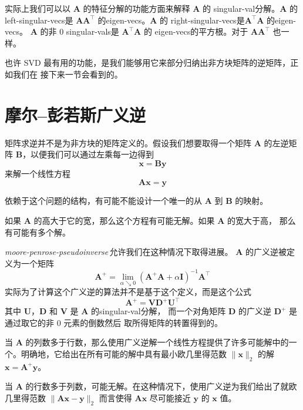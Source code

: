 实际上我们可以以 $\pmb{A}$ 的特征分解的功能方面来解释 $\pmb{A}$ 的
\gls*{singular-val}分解。$\pmb{A}$ 的\gls*{left-singular-vecs}是
$\pmb{A}\pmb{A}^{\top}$ 的\gls*{eigen-vecs}。$\pmb{A}$ 的
\gls*{right-singular-vecs}是$\pmb{A}^{\top}\pmb{A}$ 的\gls*{eigen-vecs}。
$\pmb{A}$ 的非 $0$ \gls*{singular-vals}是 $\pmb{A}^{\top}\pmb{A}$ 的
\gls*{eigen-vecs}的平方根。对于 $\pmb{A}\pmb{A}^{\top}$ 也一样。

也许 SVD 最有用的功能，是我们能够用它来部分归纳出非方块矩阵的逆矩阵，正如我们在
接下来一节会看到的。

\section{摩尔--彭若斯广义逆}
\label{sec:the_moore_penrose_pseudoinverse}

矩阵求逆并不是为非方块的矩阵定义的。假设我们想要取得一个矩阵 $\pmb{A}$ 的左逆矩
阵 $\pmb{B}$，以便我们可以通过左乘每一边得到
\begin{equation}
  \pmb{x} = \pmb{B}\pmb{y}
\end{equation}
来解一个线性方程
\begin{equation}
  \pmb{A}\pmb{x} = \pmb{y}
\end{equation}

依赖于这个问题的结构，有可能不能设计一个唯一的从 $\pmb{A}$ 到 $\pmb{B}$ 的映射。

如果 $\pmb{A}$ 的高大于它的宽，那么这个方程有可能无解。如果 $\pmb{A}$ 的宽大于高，
那么有可能有多个解。

\emph{\gls{moore-penrose-pseudoinverse}}\,允许我们在这种情况下取得进展。
$\pmb{A}$ 的广义逆被定义为一个矩阵
\begin{equation}
  \pmb{A}^+ = \lim_{\alpha \searrow 0}(\pmb{A}^+\pmb{A} +
  \alpha\pmb{I})^{-1}\pmb{A}^{\top}
\end{equation}
实际为了计算这个广义逆的算法并不是基于这个定义，而是这个公式
\begin{equation}
  \pmb{A}^+ = \pmb{V}\pmb{D}^+\pmb{U}^{\top}
\end{equation}
其中 $\pmb{U}$，$\pmb{D}$ 和 $\pmb{V}$ 是 $\pmb{A}$ 的\gls*{singular-val}分解，
而一个对角矩阵 $\pmb{D}$ 的广义逆 $\pmb{D}^+$ 是通过取它的非 $0$ 元素的倒数然后
取所得矩阵的转置得到的。

当 $\pmb{A}$ 的列数多于行数，那么使用广义逆解一个线性方程提供了许多可能解中的一
个。明确地，它给出在所有可能的解中具有最小欧几里得范数 $\|\pmb{x}\|_2$ 的解
$\pmb{x} = \pmb{A}^+\pmb{y}$。

当 $\pmb{A}$ 的行数多于列数，可能无解。在这种情况下，使用广义逆为我们给出了就欧
几里得范数 $\|\pmb{A}\pmb{x} - \pmb{y}\|_2$ 而言使得 $\pmb{A}\pmb{x}$ 尽可能接近
$\pmb{y}$ 的 $\pmb{x}$ 值。

